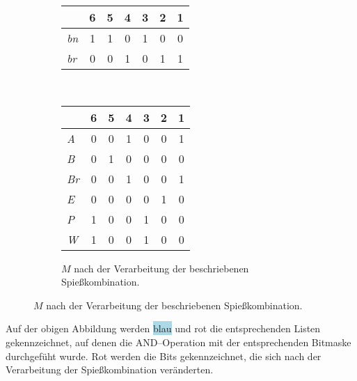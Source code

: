 \begin{figure}[H]
\begin{subfigure}[b]{.59\textwidth}
\begin{tabular}{>{\itshape}l|c|c|c|c|c|c|}
 & 6 & 5 & 4 & 3 & 2 & 1 \\ \hline
\cellcolor{lightblue}bn & 1 & 1 & 0 & 1 & 0 & 0 \\ \hline
\cellcolor{lightred}br & 0 & 0 & 1 & 0 & 1 & 1 \\ \hline
\end{tabular}\\
\vspace{0.5cm}
\begin{tabular}{>{\itshape}l|c|c|c|c|c|c|}
 & 6 & 5 & 4 & 3 & 2 & 1 \\ \hline
\cellcolor{lightred}A & 0 & {\color{red} 0} & 1 &0 & 0 & 1 \\ \hline 
\cellcolor{lightblue}B & 0 & 1 & {\color{red} 0} &0 & 0 & {\color{red} 0} \\ \hline 
\cellcolor{lightred}Br & 0 & {\color{red} 0} & 1 &0 & 0 & 1 \\ \hline 
\cellcolor{lightred}E & {\color{red} 0} & 0 & 0 & {\color{red} 0} & 1 & 0 \\ \hline 
\cellcolor{lightblue}P & 1 & 0 & 0 & 1 & {\color{red} 0} & 0 \\ \hline 
\cellcolor{lightblue}W & 1 & 0 & 0 & 1 & {\color{red} 0} & 0 \\ \hline
\end{tabular}
\caption{$M$ nach der Verarbeitung der beschriebenen Spießkombination.}
\label{fig:matrix-danach}
\end{subfigure}
\end{figure}

Auf der obigen Abbildung werden \colorbox{lightblue}{blau} und \colorbox{lightred}{rot} die entsprechenden
Listen gekennzeichnet, auf denen die AND--Operation mit der entsprechenden Bitmaske durchgefüht wurde.
{\color{red} Rot} werden die Bits gekennzeichnet, die sich nach der Verarbeitung der Spießkombination veränderten.\\

